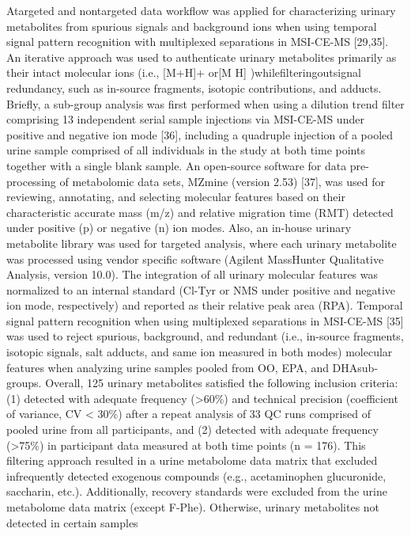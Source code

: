 \documentclass[journal=jacsat,manuscript=article]{achemso}
\begin{document}
Atargeted and nontargeted data workflow was applied for characterizing
urinary metabolites from spurious signals and background ions when using
temporal signal pattern recognition with multiplexed separations in
MSI-CE-MS {[}29,35{]}. An iterative approach was used to authenticate
urinary metabolites primarily as their intact molecular ions (i.e.,
{[}M+H{]}+ or{[}M H{]} )whilefilteringoutsignal redundancy, such as
in-source fragments, isotopic contributions, and adducts. Briefly, a
sub-group analysis was first performed when using a dilution trend
filter comprising 13 independent serial sample injections via MSI-CE-MS
under positive and negative ion mode {[}36{]}, including a quadruple
injection of a pooled urine sample comprised of all individuals in the
study at both time points together with a single blank sample. An
open-source software for data pre-processing of metabolomic data sets,
MZmine (version 2.53) {[}37{]}, was used for reviewing, annotating, and
selecting molecular features based on their characteristic accurate mass
(m/z) and relative migration time (RMT) detected under positive (p) or
negative (n) ion modes. Also, an in-house urinary metabolite library was
used for targeted analysis, where each urinary metabolite was processed
using vendor specific software (Agilent MassHunter Qualitative Analysis,
version 10.0). The integration of all urinary molecular features was
normalized to an internal standard (Cl-Tyr or NMS under positive and
negative ion mode, respectively) and reported as their relative peak
area (RPA). Temporal signal pattern recognition when using multiplexed
separations in MSI-CE-MS {[}35{]} was used to reject spurious,
background, and redundant (i.e., in-source fragments, isotopic signals,
salt adducts, and same ion measured in both modes) molecular features
when analyzing urine samples pooled from OO, EPA, and DHAsub-groups.
Overall, 125 urinary metabolites satisfied the following inclusion
criteria: (1) detected with adequate frequency (\textgreater60\%) and
technical precision (coefficient of variance, CV \textless{} 30\%) after
a repeat analysis of 33 QC runs comprised of pooled urine from all
participants, and (2) detected with adequate frequency
(\textgreater75\%) in participant data measured at both time points (n =
176). This filtering approach resulted in a urine metabolome data matrix
that excluded infrequently detected exogenous compounds (e.g.,
acetaminophen glucuronide, saccharin, etc.). Additionally, recovery
standards were excluded from the urine metabolome data matrix (except
F-Phe). Otherwise, urinary metabolites not detected in certain samples
\end{document}
